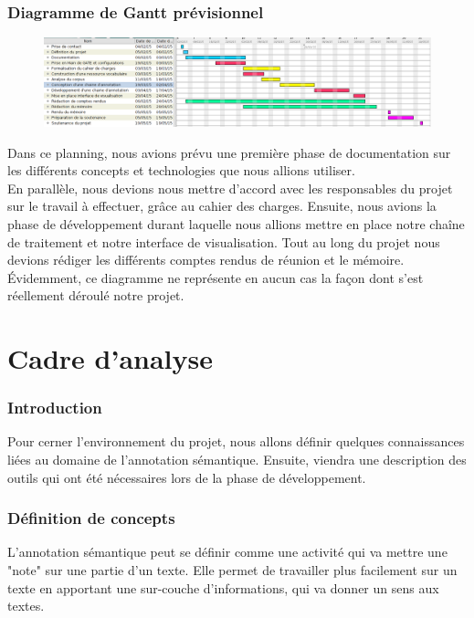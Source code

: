 \documentclass[a4paper, 11pt]{report}
\begin{document}
	\section{Diagramme de Gantt prévisionnel}
	\begin{figure}[H]
	\includegraphics[scale=.3]{img/ganttPrev.png}
	\end{figure}
	Dans ce planning, nous avions prévu une première phase de documentation sur les différents concepts et technologies que nous allions utiliser. \\
En parallèle, nous devions nous mettre d’accord avec les responsables du projet sur le travail à effectuer, grâce au cahier des charges.
Ensuite, nous avions la phase de développement durant laquelle nous allions mettre en place notre chaîne de traitement et notre interface de visualisation. Tout au long du projet nous devions rédiger les différents comptes rendus de réunion et le mémoire.\\
Évidemment, ce diagramme ne représente en aucun cas la façon dont s’est réellement déroulé notre projet.
\part{Cadre d'analyse}
\section*{Introduction}
Pour cerner l'environnement du projet, nous allons définir quelques connaissances liées au domaine de l'annotation sémantique. Ensuite, viendra une description des outils qui ont été nécessaires lors de la phase de développement.\\

\section{Définition de concepts}
L'annotation sémantique peut se définir comme une activité qui va mettre une "note" sur une partie d'un texte. Elle permet de travailler plus facilement sur un texte en apportant une sur-couche d'informations, qui va donner un sens aux textes.\cite{GLNS09}
\end{document}
